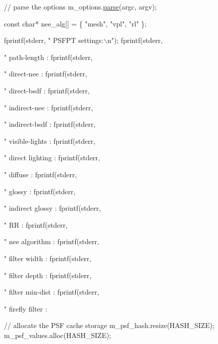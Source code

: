 \begin{DoxyCodeInclude}
    \textcolor{comment}{// parse the options}
    m\_options.\hyperlink{struct_hello_p_t_options_a540d006dee6aff8ee5e8b3cfc8b0fa0b}{parse}(argc, argv);

    \textcolor{keyword}{const} \textcolor{keywordtype}{char}* nee\_alg[] = \{ \textcolor{stringliteral}{"mesh"}, \textcolor{stringliteral}{"vpl"}, \textcolor{stringliteral}{"rl"} \};

    fprintf(stderr, \textcolor{stringliteral}{"  PSFPT settings:\(\backslash\)n"});
    fprintf(stderr, \textcolor{stringliteral}{"    path-length     : %
    fprintf(stderr, \textcolor{stringliteral}{"    direct-nee      : %
    fprintf(stderr, \textcolor{stringliteral}{"    direct-bsdf     : %
    fprintf(stderr, \textcolor{stringliteral}{"    indirect-nee    : %
    fprintf(stderr, \textcolor{stringliteral}{"    indirect-bsdf   : %
    fprintf(stderr, \textcolor{stringliteral}{"    visible-lights  : %
    fprintf(stderr, \textcolor{stringliteral}{"    direct lighting : %
    fprintf(stderr, \textcolor{stringliteral}{"    diffuse         : %
    fprintf(stderr, \textcolor{stringliteral}{"    glossy          : %
    fprintf(stderr, \textcolor{stringliteral}{"    indirect glossy : %
    fprintf(stderr, \textcolor{stringliteral}{"    RR              : %
    fprintf(stderr, \textcolor{stringliteral}{"    nee algorithm   : %
    fprintf(stderr, \textcolor{stringliteral}{"    filter width    : %
    fprintf(stderr, \textcolor{stringliteral}{"    filter depth    : %
    fprintf(stderr, \textcolor{stringliteral}{"    filter min-dist : %
    fprintf(stderr, \textcolor{stringliteral}{"    firefly filter  : %

    \textcolor{comment}{// allocate the PSF cache storage}
    m\_psf\_hash.resize(HASH\_SIZE);
    m\_psf\_values.alloc(HASH\_SIZE);

}}}}}}}}}}}}}}}}
\end{DoxyCodeInclude}
